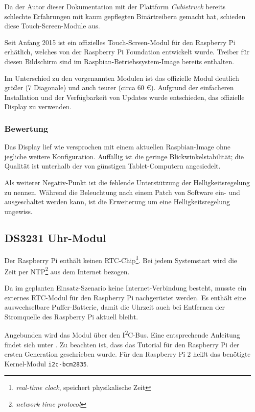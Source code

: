 \documentclass[11pt,a4paper]{IEEEtran}
\begin{document}
Da der Autor dieser Dokumentation mit der Plattform \emph{Cubietruck} bereits
schlechte Erfahrungen mit kaum gepflegten Binärtreibern gemacht hat, schieden
diese Touch-Screen-Module aus.

Seit Anfang 2015 ist ein offizielles Touch-Screen-Modul für den Raspberry Pi
erhätlich, welches von der Raspberry Pi Foundation entwickelt wurde. Treiber
für diesen Bildschirm sind im Raspbian-Betriebssystem-Image bereits enthalten.

Im Unterschied zu den vorgenannten Modulen ist das offizielle Modul deutlich
größer (\SI{7}{\inch} Diagonale) und auch teurer (circa 60 \euro). Aufgrund der
einfacheren Installation und der Verfügbarkeit von Updates wurde entschieden,
das offizielle Display zu verwenden.

\subsubsection{Bewertung}

Das Display lief wie versprochen mit einem aktuellen Raspbian-Image ohne
jegliche weitere Konfiguration. Auffällig ist die geringe
Blickwinkelstabilität; die Qualität ist unterhalb der von günstigen
Tablet-Computern angesiedelt.

Als weiterer Negativ-Punkt ist die fehlende Unterstützung der
Helligkeitsregelung zu nennen. Während die Beleuchtung nach einem Patch von
Software ein- und ausgeschaltet werden kann, ist die Erweiterung um eine
Helligkeitsregelung ungewiss\autocite{TouchBacklight}.

\subsection{DS3231 Uhr-Modul}

Der Raspberry Pi enthält keinen RTC-Chip\footnote{\emph{real-time clock},
speichert physikalische Zeit}. Bei jedem Systemstart wird die Zeit per
NTP\footnote{\emph{network time protocol}} aus dem Internet bezogen.

Da im geplanten Einsatz-Szenario keine Internet-Verbindung besteht, musste ein
externes RTC-Modul für den Raspberry Pi nachgerüstet werden. Es enthält eine
auswechselbare Puffer-Batterie, damit die Uhrzeit auch bei Entfernen der
Stromquelle des Raspberry Pi aktuell bleibt. 

Angebunden wird das Modul über den I\textsuperscript{2}C-Bus. Eine entsprechende
Anleitung findet sich unter \autocite{DS3231Tutorial}. Zu beachten ist, dass
das Tutorial für den Raspberry Pi der ersten Generation geschrieben wurde. Für
den Raspberry Pi 2 heißt das benötigte Kernel-Modul \texttt{i2c-bcm2835}.
\end{document}
